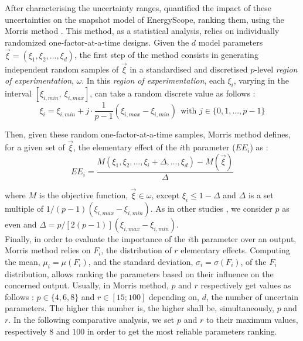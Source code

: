 After characterising the uncertainty ranges, \citet{Moret2017} quantified the impact of these uncertainties on the snapshot model of EnergyScope,  \ie ranking them, using the Morris method \cite{morris_factorial_1991}.  This method, as a statistical analysis, relies on individually randomized one-factor-at-a-time designs. Given the $d$ model parameters $\vec{\xi}=(\xi_1,\xi_2,...,\xi_d)$, the first step of the method consists in generating independent random samples of $\vec{\xi}$ in a standardised and discretised $p$-level \textit{region of experimentation}, $\omega$. In this \textit{region of experimentation}, each $\xi_i$, varying in the interval $[\xi_{i,min},~\xi_{i,max}]$, can take a random discrete value as follows :
\begin{equation}
  \xi_{i}=\xi_{i,min}+j\cdot\frac{1}{p-1}\left(\xi_{i,max}-\xi_{i,min}\right)~~\text{with }j\in\{0,1,...,p-1\}
\end{equation}

Then, given these random one-factor-at-a-time samples, Morris method defines, for a given set of $\vec{\xi}$, the elementary effect of the $i$th parameter ($EE_i$) as :
\begin{equation}
  EE_{i}=\frac{M(\xi_1,\xi_2,...,\xi_i+\Delta,...,\xi_d)-M(\vec{\xi})}{\Delta}
\end{equation}

\noindent where $M$ is the objective function, $\vec{\xi}\in\omega$, except $\xi_i\leq1-\Delta$ and $\Delta$ is a set multiple of $1/(p-1)\left(\xi_{i,max}-\xi_{i,min}\right)$. As in other studies \cite{Sin2009,Moret2017,Moret2017PhDThesis}, we consider $p$ as even and $\Delta=p/[2(p-1)]\left(\xi_{i,max}-\xi_{i,min}\right)$.\\

Finally, in order to evaluate the importance of the $i$th parameter over an output, Morris method relies on $F_i$, the distribution of $r$ elementary effects. Computing the mean, $\mu_{i}=\mu(F_{i})$, and the standard deviation, $\sigma_{i}=\sigma(F_{i})$, of the $F_{i}$ distribution, allows ranking the parameters based on their influence on the concerned output. Usually, in Morris method, $p$ and $r$ respectively get values as follows : $p\in \{4,6,8\}$ and $r\in [15;100]$ depending on, $d$, the number of uncertain parameters. The higher this number is,  the higher shall be, simultaneously, $p$ and $r$. In the following comparative analysis, we set $p$ and $r$ to their maximum values, respectively $8$ and $100$ in order to get the most reliable parameters ranking.\\


